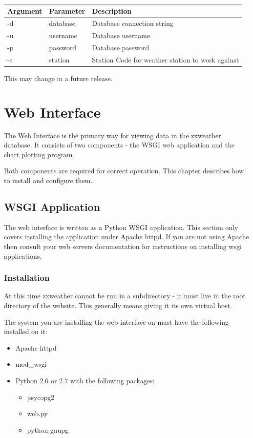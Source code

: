 \documentclass[a4paper,10pt,draft]{book}
\begin{document}
\begin{tabular}{l l p{10cm}}
\hline
\textbf{Argument} & \textbf{Parameter} & \textbf{Description} \\
\hline
-d & database & Database connection string \\
-u & username & Database username \\
-p & password & Database password \\
-s & station  & Station Code for weather station to work against \\
\hline
\end{tabular}

This may change in a future release.

\chapter{Web Interface}
\label{cha_web_interface}

The Web Interface is the primary way for viewing data in the zxweather database. It consists of two components - the WSGI web application and the chart plotting program.

Both components are required for correct operation. This chapter describes how to install and configure them.


\section{WSGI Application}

The web interface is written as a Python WSGI application. This section only covers installing the application under Apache httpd. If you are not using Apache then consult your web servers documentation for instructions on installing wsgi applications.

\subsection{Installation}

At this time zxweather cannot be run in a subdirectory - it must live in the root directory of the website. This generally means giving it its own virtual host.

The system you are installing the web interface on must have the following installed on it:
\begin{itemize}
\item Apache httpd
\item mod\_wsgi
\item Python 2.6 or 2.7 with the following packages:
\begin{itemize}
\item psycopg2
\item web.py
\item python-gnupg
\end{itemize}
\end{itemize}
\end{document}
